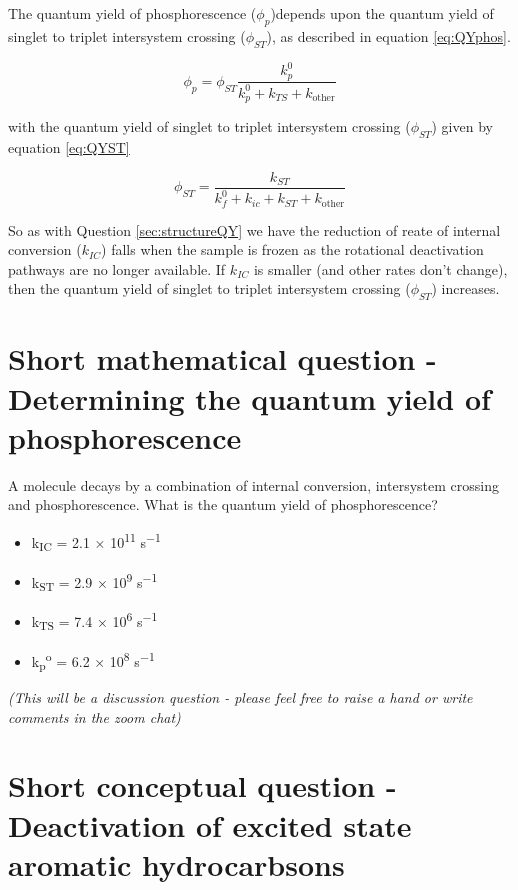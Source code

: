 \documentclass[
]{book}
\providecommand{\tightlist}{%
  \setlength{\itemsep}{0pt}\setlength{\parskip}{0pt}}
\begin{document}
The quantum yield of phosphorescence (\(\phi_p\))depends upon the quantum yield of singlet to triplet intersystem crossing (\(\phi_{ST}\)), as described in equation \eqref{eq:QYphos}.

\begin{equation}
\phi_p = \phi_{ST}\frac{k_p^0}{k_p^0+ k_{TS}+k_{\textrm{other}}}
\label{eq:QYphos}
\end{equation}

with the quantum yield of singlet to triplet intersystem crossing (\(\phi_{ST}\)) given by equation \eqref{eq:QYST}

\begin{equation}
\phi_{ST} = \frac{k_{ST}}{k_f^0+k_{ic}+ k_{ST}+k_{\textrm{other}}}
\label{eq:QYST}
\end{equation}

So as with Question \ref{sec:structureQY} we have the reduction of reate of internal conversion (\(k_{IC}\)) falls when the sample is frozen as the rotational deactivation pathways are no longer available. If \(k_{IC}\) is smaller (and other rates don't change), then the quantum yield of singlet to triplet intersystem crossing (\(\phi_{ST}\)) increases.

\hypertarget{sec:calcphos}{%
\section{Short mathematical question - Determining the quantum yield of phosphorescence}\label{sec:calcphos}}

A molecule decays by a combination of internal conversion, intersystem crossing and phosphorescence. What is the quantum yield of phosphorescence?

\begin{itemize}
\tightlist
\item
  k\textsubscript{IC} = 2.1 × 10\textsuperscript{11} s\textsuperscript{−1}
\item
  k\textsubscript{ST} = 2.9 × 10\textsuperscript{9} s\textsuperscript{−1}
\item
  k\textsubscript{TS} = 7.4 × 10\textsuperscript{6} s\textsuperscript{−1}
\item
  k\textsubscript{p}\textsuperscript{o} = 6.2 × 10\textsuperscript{8} s\textsuperscript{−1}
\end{itemize}

\emph{(This will be a discussion question - please feel free to raise a hand or write comments in the zoom chat)}

\hypertarget{sec:exhydrocarbons}{%
\section{Short conceptual question - Deactivation of excited state aromatic hydrocarbsons}\label{sec:exhydrocarbons}}
\end{document}
